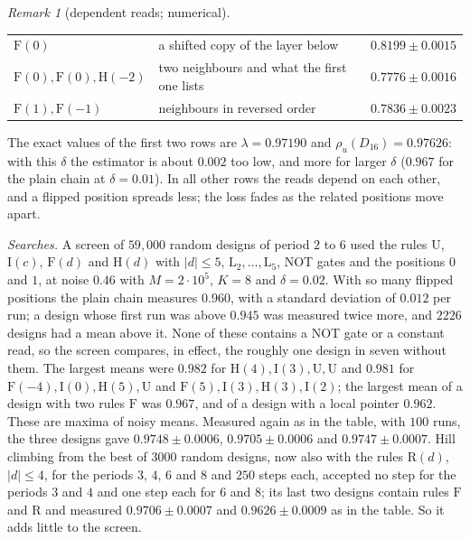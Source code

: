 \documentclass[11pt]{amsart}
\theoremstyle{definition}
\theoremstyle{remark}
\newtheorem{remark}[theorem]{Remark}
\begin{document}
\begin{remark}[dependent reads; numerical]
\begin{center}
\begin{tabular}{llc}
$\mathrm F(0)$ & a shifted copy of the layer below & $0.8199\pm0.0015$\\
$\mathrm F(0),\mathrm F(0),\mathrm H(-2)$ & two neighbours and what the first one lists & $0.7776\pm0.0016$\\
$\mathrm F(1),\mathrm F(-1)$ & neighbours in reversed order & $0.7836\pm0.0023$\\
\bottomrule
\end{tabular}
\end{center}
The exact values of the first two rows are $\lambda=0.97190$ and $\rho_u(D_{16})=0.97626$: with
this $\delta$ the estimator is about $0.002$ too low, and more for larger $\delta$ ($0.967$ for
the plain chain at $\delta=0.01$). In all other rows the reads depend on each other, and a
flipped position spreads less; the loss fades as the related positions move apart.

\emph{Searches.} A screen of $59{,}000$ random designs of period $2$ to $6$ used the rules
$\mathrm U$, $\mathrm I(c)$, $\mathrm F(d)$ and $\mathrm H(d)$ with $|d|\le5$,
$\mathrm L_2,\dots,\mathrm L_5$, NOT gates and the positions $0$ and $1$, at noise $0.46$ with
$M=2\cdot10^5$, $K=8$ and $\delta=0.02$. With so many flipped positions the plain chain measures
$0.960$, with a standard deviation of $0.012$ per run; a design whose first run was above
$0.945$ was measured twice more, and $2226$ designs had a mean above it. None of these contains a
NOT gate or a constant read, so the screen compares, in effect, the roughly one design in seven
without them. The largest means were $0.982$ for
$\mathrm H(4),\mathrm I(3),\mathrm U,\mathrm U$ and $0.981$ for
$\mathrm F(-4),\mathrm I(0),\mathrm H(5),\mathrm U$ and
$\mathrm F(5),\mathrm I(3),\mathrm H(3),\mathrm I(2)$; the largest mean of a design with two
rules $\mathrm F$ was $0.967$, and of a design with a local pointer $0.962$. These are maxima of
noisy means. Measured again as in the table, with $100$ runs, the three designs gave
$0.9748\pm0.0006$, $0.9705\pm0.0006$ and $0.9747\pm0.0007$. Hill climbing from the best of
$3000$ random designs, now also with the rules $\mathrm R(d)$, $|d|\le4$, for the periods $3$,
$4$, $6$ and $8$ and $250$ steps each, accepted no step for the periods $3$ and $4$ and one step
each for $6$ and $8$; its last two designs contain rules $\mathrm F$ and $\mathrm R$ and
measured $0.9706\pm0.0007$ and $0.9626\pm0.0009$ as in the table. So it adds little to the
screen.


\end{remark}
\end{document}

